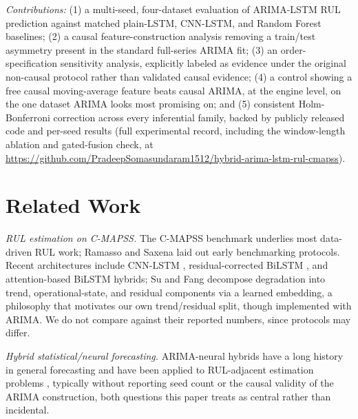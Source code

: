 \documentclass[conference]{IEEEtran}
\newif\ifblind
\begin{document}
\emph{Contributions:} (1) a multi-seed, four-dataset evaluation of ARIMA-LSTM RUL prediction against matched plain-LSTM, CNN-LSTM, and Random Forest baselines; (2) a causal feature-construction analysis removing a train/test asymmetry present in the standard full-series ARIMA fit; (3) an order-specification sensitivity analysis, explicitly labeled as evidence under the original non-causal protocol rather than validated causal evidence; (4) a control showing a free causal moving-average feature beats causal ARIMA, at the engine level, on the one dataset ARIMA looks most promising on; and (5) consistent Holm-Bonferroni correction across every inferential family, backed by publicly released code and per-seed results (full experimental record, including the window-length ablation and gated-fusion check, at \ifblind [repository URL withheld for blind review]\else \url{https://github.com/PradeepSomasundaram1512/hybrid-arima-lstm-rul-cmapss}\fi).

\section{Related Work}
\emph{RUL estimation on C-MAPSS.} The C-MAPSS benchmark \cite{saxena2008} underlies most data-driven RUL work; Ramasso and Saxena \cite{cmapssbenchmark2014} laid out early benchmarking protocols. Recent architectures include CNN-LSTM \cite{cnnlstm2024}, residual-corrected BiLSTM \cite{biclstm2026}, and attention-based BiLSTM \cite{sharma2025} hybrids; Su and Fang \cite{multiheadattn2026} decompose degradation into trend, operational-state, and residual components via a learned embedding, a philosophy that motivates our own trend/residual split, though implemented with ARIMA. We do not compare against their reported numbers, since protocols may differ.

\emph{Hybrid statistical/neural forecasting.} ARIMA-neural hybrids have a long history in general forecasting \cite{zhang2003} and have been applied to RUL-adjacent estimation problems \cite{arimalstmvalve2022}, typically without reporting seed count or the causal validity of the ARIMA construction, both questions this paper treats as central rather than incidental.
\end{document}
